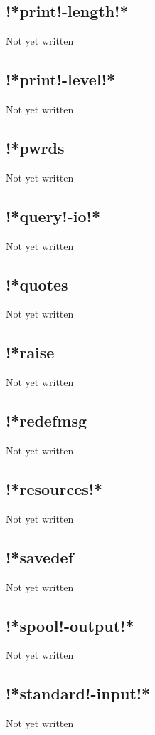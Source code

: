 \documentclass[a4paper,11pt]{article}
\begin{document}
\subsection{\ttfamily !*print!-length!*}
   Not yet written

\subsection{\ttfamily !*print!-level!*}
   Not yet written

\subsection{\ttfamily !*pwrds}
   Not yet written

\subsection{\ttfamily !*query!-io!*}
   Not yet written

\subsection{\ttfamily !*quotes}
   Not yet written

\subsection{\ttfamily !*raise}
   Not yet written

\subsection{\ttfamily !*redefmsg}
   Not yet written

\subsection{\ttfamily !*resources!*}
   Not yet written

\subsection{\ttfamily !*savedef}
   Not yet written

\subsection{\ttfamily !*spool!-output!*}
   Not yet written

\subsection{\ttfamily !*standard!-input!*}
   Not yet written
\end{document}
